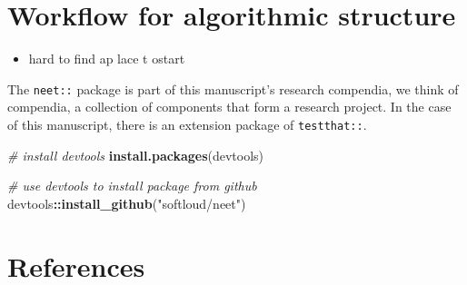 \documentclass[
]{article}
\newenvironment{Shaded}{\begin{snugshade}}{\end{snugshade}}
\newcommand{\CommentTok}[1]{\textcolor[rgb]{0.56,0.35,0.01}{\textit{#1}}}
\newcommand{\KeywordTok}[1]{\textcolor[rgb]{0.13,0.29,0.53}{\textbf{#1}}}
\newcommand{\NormalTok}[1]{#1}
\newcommand{\OperatorTok}[1]{\textcolor[rgb]{0.81,0.36,0.00}{\textbf{#1}}}
\newcommand{\StringTok}[1]{\textcolor[rgb]{0.31,0.60,0.02}{#1}}
\providecommand{\tightlist}{%
  \setlength{\itemsep}{0pt}\setlength{\parskip}{0pt}}
\begin{document}
\hypertarget{workflow-for-algorithmic-structure}{%
\section{Workflow for algorithmic
structure}\label{workflow-for-algorithmic-structure}}

\begin{itemize}
\tightlist
\item
  hard to find ap lace t ostart
\end{itemize}

The \texttt{neet::} package is part of this manuscript's research
compendia, we think of compendia, a collection of components that form a
research project. In the case of this manuscript, there is an extension
package of \texttt{testthat::}.

\begin{Shaded}
\begin{Highlighting}[]
\CommentTok{\# install devtools}
\KeywordTok{install.packages}\NormalTok{(devtools) }

\CommentTok{\# use devtools to install package from github}
\NormalTok{devtools}\OperatorTok{::}\KeywordTok{install\_github}\NormalTok{(}\StringTok{"softloud/neet"}\NormalTok{)}
\end{Highlighting}
\end{Shaded}

\hypertarget{references}{%
\section*{References}\label{references}}
\end{document}
